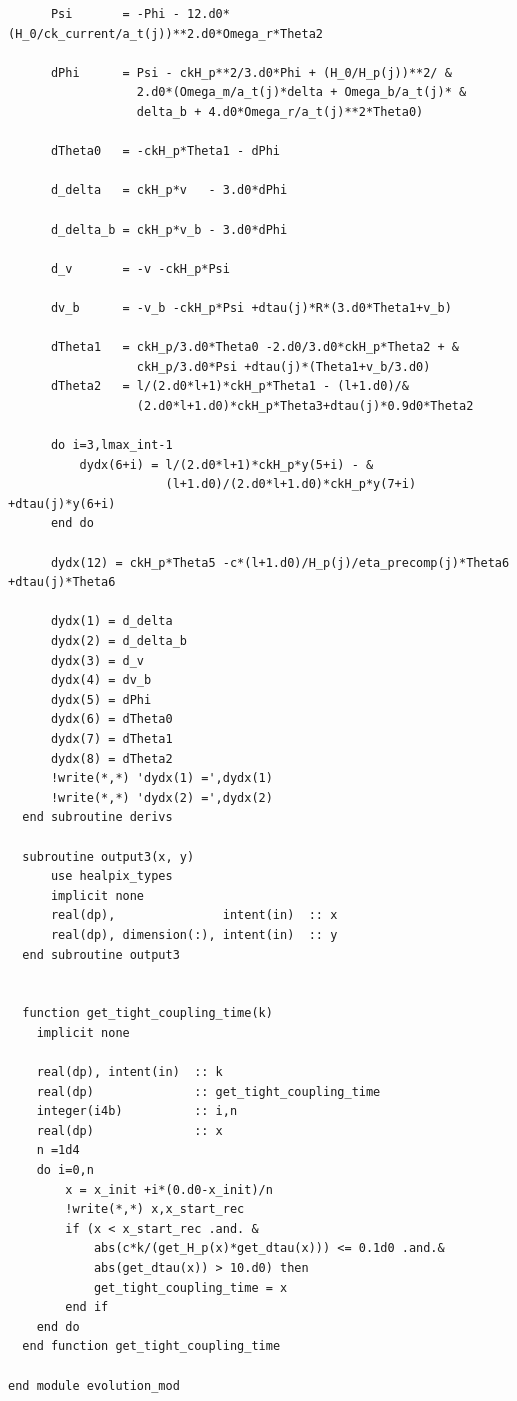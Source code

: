 \documentclass[a4paper]{report}
\begin{document}
\begin{verbatim}
      Psi       = -Phi - 12.d0*(H_0/ck_current/a_t(j))**2.d0*Omega_r*Theta2

      dPhi      = Psi - ckH_p**2/3.d0*Phi + (H_0/H_p(j))**2/ &
                  2.d0*(Omega_m/a_t(j)*delta + Omega_b/a_t(j)* &
                  delta_b + 4.d0*Omega_r/a_t(j)**2*Theta0)

      dTheta0   = -ckH_p*Theta1 - dPhi

      d_delta   = ckH_p*v   - 3.d0*dPhi

      d_delta_b = ckH_p*v_b - 3.d0*dPhi

      d_v       = -v -ckH_p*Psi

      dv_b      = -v_b -ckH_p*Psi +dtau(j)*R*(3.d0*Theta1+v_b)

      dTheta1   = ckH_p/3.d0*Theta0 -2.d0/3.d0*ckH_p*Theta2 + &
                  ckH_p/3.d0*Psi +dtau(j)*(Theta1+v_b/3.d0)
      dTheta2   = l/(2.d0*l+1)*ckH_p*Theta1 - (l+1.d0)/&
                  (2.d0*l+1.d0)*ckH_p*Theta3+dtau(j)*0.9d0*Theta2

      do i=3,lmax_int-1
          dydx(6+i) = l/(2.d0*l+1)*ckH_p*y(5+i) - &
                      (l+1.d0)/(2.d0*l+1.d0)*ckH_p*y(7+i) +dtau(j)*y(6+i)
      end do

      dydx(12) = ckH_p*Theta5 -c*(l+1.d0)/H_p(j)/eta_precomp(j)*Theta6 +dtau(j)*Theta6

      dydx(1) = d_delta
      dydx(2) = d_delta_b
      dydx(3) = d_v
      dydx(4) = dv_b
      dydx(5) = dPhi
      dydx(6) = dTheta0
      dydx(7) = dTheta1
      dydx(8) = dTheta2
      !write(*,*) 'dydx(1) =',dydx(1)
      !write(*,*) 'dydx(2) =',dydx(2)
  end subroutine derivs

  subroutine output3(x, y)
      use healpix_types
      implicit none
      real(dp),               intent(in)  :: x
      real(dp), dimension(:), intent(in)  :: y
  end subroutine output3


  function get_tight_coupling_time(k)
    implicit none

    real(dp), intent(in)  :: k
    real(dp)              :: get_tight_coupling_time
    integer(i4b)          :: i,n
    real(dp)              :: x
    n =1d4
    do i=0,n
        x = x_init +i*(0.d0-x_init)/n
        !write(*,*) x,x_start_rec
        if (x < x_start_rec .and. &
            abs(c*k/(get_H_p(x)*get_dtau(x))) <= 0.1d0 .and.& 
            abs(get_dtau(x)) > 10.d0) then 
            get_tight_coupling_time = x
        end if
    end do
  end function get_tight_coupling_time

end module evolution_mod
\end{verbatim}



\end{document}

